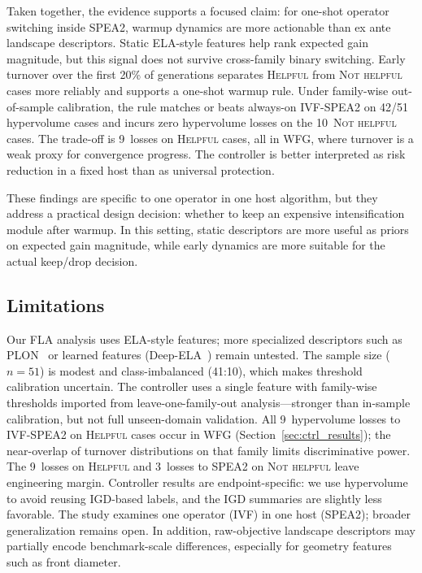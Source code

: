 \documentclass[conference]{IEEEtran}
\begin{document}
Taken together, the evidence supports a focused claim: for one-shot operator
switching inside SPEA2, warmup dynamics are more actionable than ex ante
landscape descriptors. Static ELA-style features help rank expected gain
magnitude, but this signal does not survive cross-family binary switching.
Early turnover over the first 20\% of generations separates
\textsc{Helpful} from \textsc{Not helpful} cases more reliably and supports a
one-shot warmup rule. Under family-wise out-of-sample calibration, the rule
matches or beats always-on IVF-SPEA2 on 42/51 hypervolume cases and incurs
zero hypervolume losses on the 10~\textsc{Not helpful} cases. The trade-off is
9~losses on \textsc{Helpful} cases, all in WFG, where turnover is a weak proxy
for convergence progress. The controller is better interpreted as
risk reduction in a fixed host than as universal protection.

These findings are specific to one operator in one host algorithm, but they
address a practical design decision: whether to keep an expensive
intensification module after warmup. In this setting, static descriptors are
more useful as priors on expected gain magnitude, while early dynamics are
more suitable for the actual keep/drop decision.

\subsection{Limitations}
Our FLA analysis uses ELA-style features; more specialized descriptors such as
PLON~\cite{ochoa2024funnels} or learned features
(Deep-ELA~\cite{seiler2024deep}) remain untested. The sample size
($n = 51$) is modest and class-imbalanced (41:10), which makes threshold
calibration uncertain. The controller uses a single feature with family-wise
thresholds imported from leave-one-family-out analysis---stronger than
in-sample calibration, but not full unseen-domain validation. All
9~hypervolume losses to IVF-SPEA2 on \textsc{Helpful} cases occur in WFG
(Section~\ref{sec:ctrl_results}); the near-overlap of turnover distributions
on that family limits discriminative power. The 9~losses on \textsc{Helpful}
and 3~losses to SPEA2 on \textsc{Not helpful} leave engineering margin.
Controller results are endpoint-specific: we use hypervolume to avoid reusing
IGD-based labels, and the IGD summaries are slightly less favorable. The
study examines one operator (IVF) in one host (SPEA2); broader
generalization remains open. In addition, raw-objective landscape
descriptors may partially encode benchmark-scale differences, especially
for geometry features such as front diameter.
\end{document}
